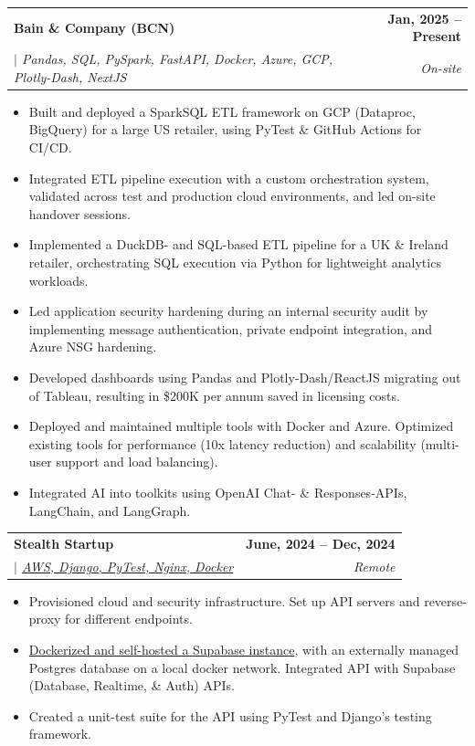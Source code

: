 \documentclass[letterpaper,11pt]{article}
\makeatletter
\newcommand{\uniformunderline}[1]{%
  \uline{\phantom{#1}}%
  \llap{\contour{white}{#1}}%
}
\newcommand{\resumeItem}[1]{
  \item\small{
    {#1 \vspace{-0.5pt}}
  }
}
\newcommand{\resumeSubheading}[4]{
  \vspace{-1pt}\item
    \begin{tabular*}{1.0\textwidth}[t]{l@{\extracolsep{\fill}}r}
      \textbf{\large#1} & \textbf{\small #2} \\
      \textit{\large#3} & \textit{\small #4} \\

    \end{tabular*}\vspace{-7pt}
}
\newcommand{\resumeItemListStart}{\begin{itemize}}
\newcommand{\resumeItemListEnd}{\end{itemize}\vspace{-5pt}}
\makeatother
\begin{document}
        \resumeSubheading
            {Bain \& Company (BCN)}{Jan, 2025 -- Present} 
            {\uniformunderline{Analyst} $|$ \textnormal{Pandas, SQL, PySpark, FastAPI, Docker, Azure, GCP, Plotly-Dash, NextJS } } {On-site}
            \resumeItemListStart
                \resumeItem{\normalsize{Built and deployed a SparkSQL ETL framework on GCP (Dataproc, BigQuery) for a large US retailer, \newline using PyTest \& GitHub Actions for CI/CD.}}
                \resumeItem{\normalsize{Integrated ETL pipeline execution with a custom orchestration system, validated across test and production cloud environments, and led on-site handover sessions.}}
                \resumeItem{\normalsize{Implemented a DuckDB- and SQL-based ETL pipeline for a UK \& Ireland retailer, orchestrating SQL execution via Python for lightweight analytics workloads.}}
                \resumeItem{\normalsize{Led application security hardening during an internal security audit by implementing message authentication, private endpoint integration, and Azure NSG hardening.}}
                \resumeItem{\normalsize{Developed dashboards using Pandas and Plotly-Dash/ReactJS migrating out of Tableau, resulting in \newline \$200K per annum saved in licensing costs.}}
                \resumeItem{\normalsize{Deployed and maintained multiple tools with Docker and Azure. Optimized existing tools for performance (10x latency reduction) and scalability (multi-user support and load balancing).}}
                \resumeItem{\normalsize{Integrated AI into toolkits using OpenAI Chat- \& Responses-APIs, LangChain, and LangGraph.}}
            \resumeItemListEnd

        \resumeSubheading
            {Stealth Startup}{June, 2024 -- Dec, 2024} 
            {\uniformunderline{DevOps \& Application Engineer} $|$ \textnormal{\href{https://github.com/saharshbhansali/supabase-decoupled-postgres}{AWS, Django, PyTest, Nginx, Docker \footnotesize{\raisebox{-0.05\height}\faExternalLink}}} }{Remote}
            \resumeItemListStart
                \resumeItem{\normalsize{Provisioned cloud and security infrastructure. Set up API servers and reverse-proxy for different endpoints.}}
                \resumeItem{\normalsize{\href{https://github.com/saharshbhansali/supabase-decoupled-postgres}{Dockerized and self-hosted a Supabase instance}, with an externally managed Postgres database on a local docker network. Integrated API with Supabase (Database, Realtime, \& Auth) APIs.}}
                \resumeItem{\normalsize{Created a unit-test suite for the API using PyTest and Django's testing framework.}}
            \resumeItemListEnd  
\end{document}
